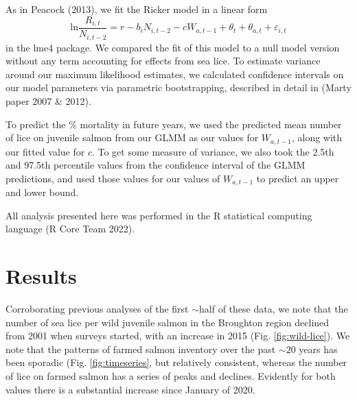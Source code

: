 \documentclass{article}
\begin{document}
As in Peacock (2013), we fit the Ricker model in a linear form $$\textrm{ln}\frac{R_{i,t}}{N_{i,t-2}} = r - b_i N_{i,t-2} - c W_{a,t-1} + \theta_t + \theta_{a,t} + \varepsilon_{i,t}$$ in the lme4 package. We compared the fit of this model to a null model version without any term accounting for effects from sea lice. To estimate variance around our maximum likelihood estimates, we calculated confidence intervals on our model parameters via parametric bootstrapping, described in detail in (Marty paper 2007 \& 2012). 

To predict the \% mortality in future years, we used the predicted mean number of lice on juvenile salmon from our GLMM as our values for $W_{a,t-1}$, along with our fitted value for $c$. To get some measure of variance, we also took the 2.5th and 97.5th percentile values from the confidence interval of the GLMM predictions, and used those values for our values of $W_{a,t-1}$ to predict an upper and lower bound. 

All analysis presented here was performed in the R statistical computing language (R Core Team 2022). 

\section{Results}

Corroborating previous analyses of the first $\sim$half of these data, we note that the number of sea lice per wild juvenile salmon in the Broughton region declined from 2001 when surveys started, with an increase in 2015 (Fig. \ref{fig:wild-lice}). We note that the patterns of farmed salmon inventory over the past $\sim 20$ years has been sporadic (Fig. \ref{fig:timeseries}, but relatively consistent, whereas the number of lice on farmed salmon has a series of peaks and declines. Evidently for both values there is a substantial increase since January of 2020.  
\end{document}
